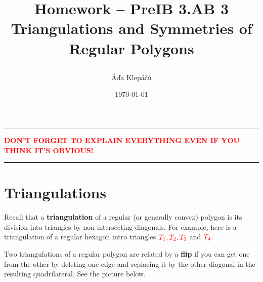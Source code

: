 \documentclass[a4paper,11pt]{article}
\title{\Huge\textsf{Homework -- PreIB 3.AB 3}\\
 \Large\textsf{Triangulations and Symmetries of Regular Polygons}
 \author{Áďa Klepáčů}
 \date{\today}
}
\newcommand{\clr}{\textcolor{red}}
\begin{document}
\maketitle
\thispagestyle{fancy}

\begin{center}
 \hrule
 \textbf{\clr{DON'T FORGET TO EXPLAIN EVERYTHING EVEN IF YOU THINK IT'S
 OBVIOUS!}}
 \vspace{2ex}
 \hrule
\end{center}
 
\section*{Triangulations}

Recall that a \textbf{triangulation} of a regular (or generally convex) polygon
is its division into triangles by non-intersecting diagonals. For example, here
is a triangulation of a regular hexagon intro triangles $\clr{T_1,T_2,T_3}$ and
$\clr{T_4}$.

\begin{figure}[ht]
 \centering
\end{figure}

Two triangulations of a regular polygon are related by a \textbf{flip} if you
can get one from the other by deleting one edge and replacing it by the other
diagonal in the resulting quadrilateral. See the picture below.
\end{document}
